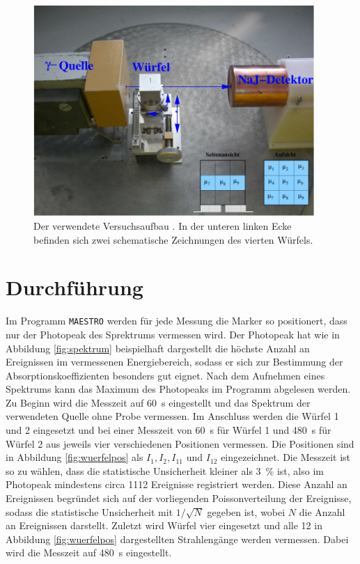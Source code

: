 \begin{figure}
  \centering
  \includegraphics[height=8.0cm]{content/aufbau.pdf} %
  \caption{Der verwendete Versuchsaufbau \cite[4]{anleitung}. In der unteren linken Ecke befinden
  sich zwei schematische Zeichnungen des vierten Würfels.}
  \label{fig:aufbau}
\end{figure}

\section{Durchführung}
\label{sec:Durchführung}

Im Programm \texttt{MAESTRO} werden für jede Messung die Marker so positionert,
dass nur der Photopeak des Sprektrums vermessen wird.
Der Photopeak hat wie in Abbildung \ref{fig:spektrum} beispielhaft dargestellt
die höchste Anzahl an Ereignissen im vermessenen Energiebereich, sodass
er sich zur Bestimmung der Absorptionskoeffizienten besonders gut eignet.
Nach dem Aufnehmen eines Spektrums
kann das Maximum des Photopeaks im Programm abgelesen werden.
Zu Beginn wird die Messzeit auf \SI{60}{\second} eingestellt und das Spektrum
der verwendeten Quelle ohne Probe vermessen. Im Anschluss werden die
Würfel \num{1} und \num{2} eingesetzt und bei einer Messzeit von
\SI{60}{\second} für Würfel \num{1} und \SI{480}{\second} für Würfel \num{2}
aus jeweils vier verschiedenen Positionen vermessen. Die Positionen sind
in Abbildung \ref{fig:wuerfelpos} als
$I_{1}, I_{2}, I_{11}$ und $I_{12}$ eingezeichnet.
Die Messzeit ist so zu wählen, dass die statistische Unsicherheit kleiner
als \SI{3}{\percent} ist, also im Photopeak mindestens circa \num{1112}
Ereignisse registriert werden.
Diese Anzahl an Ereignissen begründet sich auf der vorliegenden
Poissonverteilung der Ereignisse, sodass die statistische Unsicherheit
mit $1 / \sqrt{N}$ gegeben ist, wobei $N$ die Anzahl an Ereignissen darstellt.
Zuletzt wird Würfel vier eingesetzt und alle \num{12} in Abbildung
\ref{fig:wuerfelpos} dargestellten Strahlengänge werden vermessen. Dabei wird die
Messzeit auf \SI{480}{\second} eingestellt.

